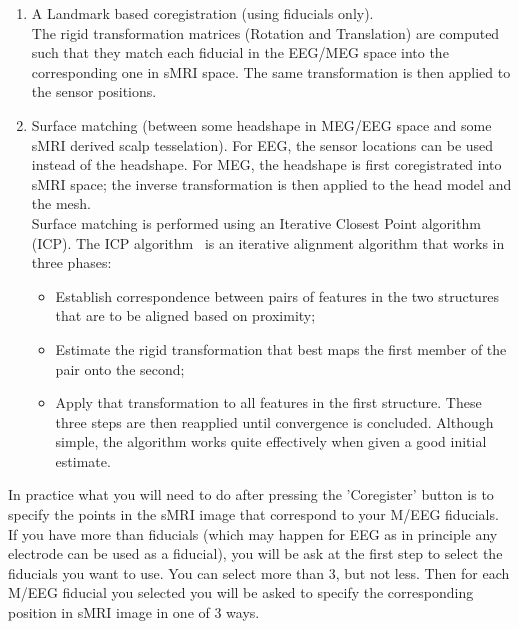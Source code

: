 \begin{enumerate}
    \item A Landmark based coregistration (using fiducials only).\\
    The rigid transformation matrices (Rotation and Translation) are computed such that 
they match each fiducial in the EEG/MEG space into the corresponding one in sMRI space. The same 
transformation is then applied to the sensor positions.
    \item Surface matching (between some headshape in MEG/EEG space and some sMRI derived scalp tesselation).
For EEG, the sensor locations can be used instead of the headshape. For MEG, the headshape is 
first coregistrated into sMRI space; the inverse transformation is then applied to the head model
and the mesh.\\
Surface matching is performed using an Iterative Closest Point algorithm (ICP). 
The ICP algorithm~\cite{Besl_McKay} is an iterative alignment algorithm that works in three phases:
\begin{itemize}
    \item Establish correspondence between pairs of features in the two structures that 
    are to be aligned based on proximity;
    \item Estimate the rigid transformation that best maps the first member of the 
     pair onto the second;
    \item Apply that transformation to all features in the first structure. These three
     steps are then reapplied until convergence is concluded.
Although simple, the algorithm works quite effectively when given a good initial estimate.
\end{itemize}
\end{enumerate}

In practice what you will need to do after pressing  the 'Coregister' button is to specify the points
in the sMRI image that correspond to your M/EEG fiducials. If you have more than fiducials (which may happen
for EEG as in principle any electrode can be used as a fiducial), you will be ask at the first step to select
the fiducials you want to use. You can select more than 3, but not less. Then for each M/EEG fiducial you selected
you will be asked to specify the corresponding position in sMRI image in one of 3 ways. 


